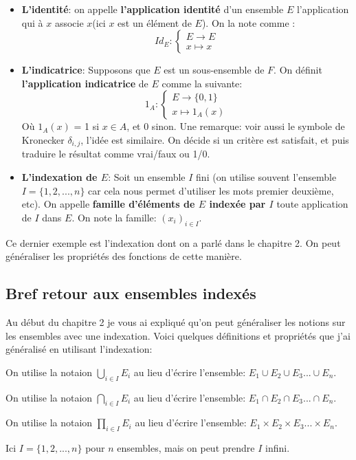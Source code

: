 \documentclass{article}
\begin{document}
\begin{itemize}
 \item \textbf{L'identité}: on appelle \textbf{l'application identité} d'un ensemble $E$ l'application qui à $x$ associe $x$(ici $x$ est un élément de $E$). On la note comme :
 \[
{Id}_{E} : 
\begin{cases} 
E \to E \\
x \mapsto x
\end{cases}
\]
 \item \textbf{L'indicatrice}: Supposons que $E$ est un sous-ensemble de $F$. On définit \textbf{l'application indicatrice} de $E$ comme la suivante:
 \[
{1}_{A} : 
\begin{cases} 
E \to \{0,1\} \\
x \mapsto {1}_{A}(x)
\end{cases}
\]
Où ${1}_{A}(x)$ = 1 si $x \in A$, et 0 sinon. Une remarque: voir aussi le symbole de Kronecker $\delta_{i,j}$, l'idée est similaire. On décide si un critère est satisfait, et puis traduire le résultat comme vrai/faux ou 1/0.
 \item \textbf{L'indexation de $E$}: Soit un ensemble $I$ fini (on utilise souvent l'ensemble $I = \{1,2, ... ,n\}$ car cela nous permet d'utiliser les mots premier deuxième, etc). On appelle \textbf{famille d'éléments de $E$ indexée par $I$} toute application de $I$ dans $E$. On note la famille: $(x_{i})_{i \in I}$.
\end{itemize}

Ce dernier exemple est l'indexation dont on a parlé dans le chapitre 2. On peut généraliser les propriétés des fonctions de cette manière.

\subsection{Bref retour aux ensembles indexés}

Au début du chapitre 2 je vous ai expliqué qu'on peut généraliser les notions sur les ensembles avec une indexation. Voici quelques définitions et propriétés que j'ai généralisé en utilisant l'indexation:

\begin{tcolorbox}[colback=yellow!5!white,colframe=yellow!75!black,title={Notation 3.3: Généralisation de la réunion, de l'intersection et du produit cartésien}]



On utilise la notaion $\bigcup\limits_{i \in I} E_i$ au lieu d'écrire l'ensemble: $E_{1}\cup E_{2}\cup E_{3} ... \cup E_{n}$.



On utilise la notaion $\bigcap\limits_{i \in I} E_i$ au lieu d'écrire l'ensemble: $E_{1}\cap E_{2}\cap E_{3} ... \cap E_{n}$.

On utilise la notaion $\prod\limits_{i \in I} E_i$ au lieu d'écrire l'ensemble: $E_{1}\times E_{2}\times E_{3} ... \times E_{n}$.

\tcblower

Ici $I = \{1,2, ... ,n\}$ pour $n$ ensembles, mais on peut prendre $I$ infini.


\end{tcolorbox}
\end{document}
